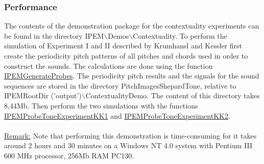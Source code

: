 \subsubsection*{Performance}
The contents of the demonstration package for the contextuality
experiments can be found in the directory
IPEM$\backslash$Demos$\backslash$Contextuality. To perform the
simulation of Experiment I and II described by Krumhansl and
Kessler first create the periodicity pitch patterns of all
pitches and chords used in order to construct the sounds. The
calculations are done using the function
\hyperlink{FuncRef:IPEMGenerateProbes}{IPEMGenerateProbes}. The
periodicity pitch results and the signals for the sound sequences
are stored in the directory PitchImagesShepardTone, relative to
IPEMRootDir ('output')$\backslash$ContextualityDemo. The content
of this directory takes 8,44Mb. Then perform the two simulations
with the functions
\hyperlink{FuncRef:IPEMProbeToneExperimentKK1}{IPEMProbeToneExperimentKK1}
and
\hyperlink{FuncRef:IPEMProbeToneExperimentKK2}{IPEMProbeToneExperimentKK2}.\\\\

\underline {Remark:} Note that performing this demonstration is
time-consuming for it takes around 2 hours and 30 minutes on a
Windows NT 4.0 system with Pentium III 600 MHz processor, 256Mb
RAM PC130.

